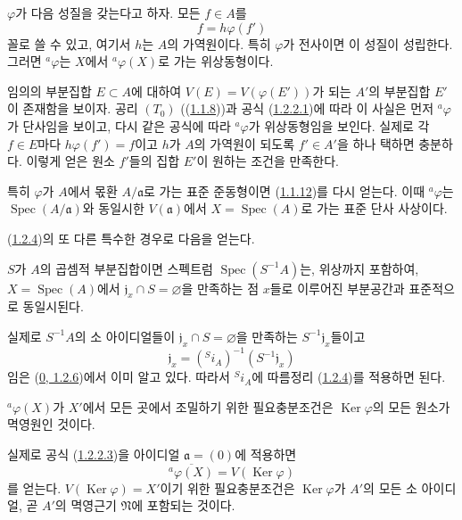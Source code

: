 \begin{corollary}[1.2.4]
\label{I.1.2.4-ko}
$\varphi$가 다음 성질을 갖는다고 하자. 모든 $f\in A$를
\[
  f=h\varphi(f')
\]
꼴로 쓸 수 있고, 여기서 $h$는 $A$의 가역원이다. 특히
$\varphi$가 전사이면 이 성질이 성립한다. 그러면 ${}^a\varphi$는
$X$에서 ${}^a\varphi(X)$로 가는 위상동형이다.
\end{corollary}

임의의 부분집합 $E\subset A$에 대하여
$V(E)=V(\varphi(E'))$가 되는 $A'$의 부분집합 $E'$이 존재함을
보이자. 공리 $(T_0)$
((\hyperref[I.1.1.8-ko]{1.1.8}))과 공식
(\hyperref[I.1.2.2.1-ko]{1.2.2.1})에 따라 이 사실은 먼저
${}^a\varphi$가 단사임을 보이고, 다시 같은 공식에 따라
${}^a\varphi$가 위상동형임을 보인다. 실제로 각 $f\in E$마다
$h\varphi(f')=f$이고 $h$가 $A$의 가역원이 되도록 $f'\in A'$을
하나 택하면 충분하다. 이렇게 얻은 원소 $f'$들의 집합 $E'$이 원하는
조건을 만족한다.

\begin{env}[1.2.5]
\label{I.1.2.5-ko}
특히 $\varphi$가 $A$에서 몫환 $A/\mathfrak{a}$로 가는 표준
준동형이면 (\hyperref[I.1.1.12-ko]{1.1.12})를 다시 얻는다. 이때
${}^a\varphi$는 $\operatorname{Spec}(A/\mathfrak{a})$와 동일시한
$V(\mathfrak{a})$에서 $X=\operatorname{Spec}(A)$로 가는 표준
단사 사상이다.
\end{env}

(\hyperref[I.1.2.4-ko]{1.2.4})의 또 다른 특수한 경우로 다음을
얻는다.

\begin{corollary}[1.2.6]
\label{I.1.2.6-ko}
$S$가 $A$의 곱셈적 부분집합이면 스펙트럼
$\operatorname{Spec}(S^{-1}A)$는, 위상까지 포함하여,
$X=\operatorname{Spec}(A)$에서
$\mathfrak{j}_x\cap S=\varnothing$을 만족하는 점 $x$들로 이루어진
부분공간과 표준적으로 동일시된다.
\end{corollary}

실제로 $S^{-1}A$의 소 아이디얼들이
$\mathfrak{j}_x\cap S=\varnothing$을 만족하는
$S^{-1}\mathfrak{j}_x$들이고
\[
  \mathfrak{j}_x=({}^S i_A)^{-1}(S^{-1}\mathfrak{j}_x)
\]
임은 (\hyperref[0.1.2.6-ko]{0, 1.2.6})에서 이미 알고 있다. 따라서
${}^S i_A$에 따름정리 (\hyperref[I.1.2.4-ko]{1.2.4})를 적용하면
된다.

\begin{corollary}[1.2.7]
\label{I.1.2.7-ko}
${}^a\varphi(X)$가 $X'$에서 모든 곳에서 조밀하기 위한 필요충분조건은
$\operatorname{Ker}\varphi$의 모든 원소가 멱영원인 것이다.
\end{corollary}

실제로 공식 (\hyperref[I.1.2.2.3-ko]{1.2.2.3})을 아이디얼
$\mathfrak{a}=(0)$에 적용하면
\[
  \overline{{}^a\varphi(X)}=V(\operatorname{Ker}\varphi)
\]
를 얻는다. $V(\operatorname{Ker}\varphi)=X'$이기 위한
필요충분조건은 $\operatorname{Ker}\varphi$가 $A'$의 모든 소
아이디얼, 곧 $A'$의 멱영근기 $\mathfrak{N}$에 포함되는 것이다.

